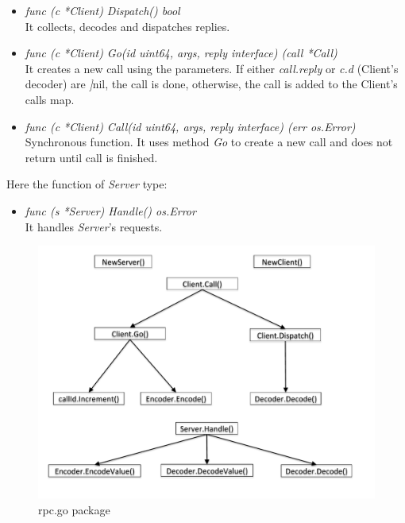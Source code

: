 \begin{itemize}

\item \emph{func (c *Client) Dispatch() bool}\\
It collects, decodes and dispatches replies.

\item \emph{func (c *Client) Go(id uint64, args, reply interface{}) (call *Call)}\\
It creates a new call using the parameters. If either \emph{call.reply} or \emph{c.d} (Client's decoder) are \emph]{nil}, the call is done, otherwise, the call is added to the Client's calls map.

\item \emph{func (c *Client) Call(id uint64, args, reply interface{}) (err os.Error)}\\
Synchronous function. It uses method \emph{Go} to create a new call and does not return until call is finished. 

\end{itemize}
Here the function of \emph{Server} type:

\begin{itemize}

\item \emph{func (s *Server) Handle() os.Error}\\
It handles \emph{Server}'s requests.

\end{itemize}


\begin{figure}[H]
\centering
\includegraphics[scale=0.50]{callGraphs/rpcPackage}
\caption{rpc.go package}
\end{figure}
